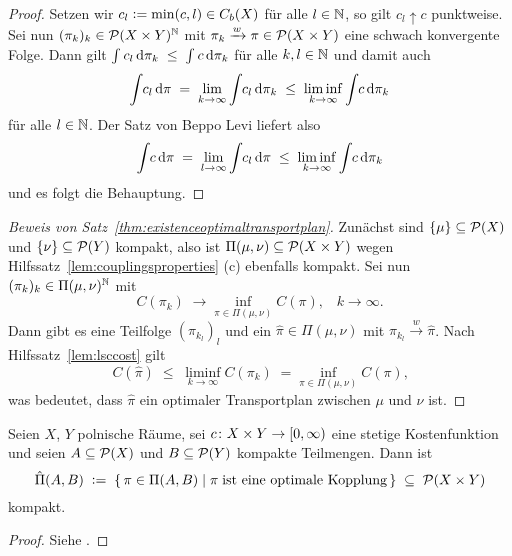 \documentclass[../main/main.tex]{subfiles}
\begin{document}
	\begin{proof}
		Setzen wir $c_l \vcentcolon = \min(c, l) \in C_b(X)$ für alle $l \in \mathbb{N}$, so gilt $c_l \uparrow c$ punktweise. Sei nun $(\pi_k)_k \in \mathcal{P}(X \times Y)^{\mathbb{N}}$ mit $\pi_k \xrightarrow{w} \pi \in \mathcal{P}(X \times Y)$ eine schwach konvergente Folge. Dann gilt
		$\int_{} \, c_l \, \mathrm{d}\pi_k \; \leq \; \int_{} \, c \, \mathrm{d}\pi_k$ für alle $k, l \in \mathbb{N}$ und damit auch 
		\[ \int_{} \, c_l \, \mathrm{d}\pi \; = \; \lim_{k \to \infty} \int_{} \, c_l \, \mathrm{d}\pi_k \; \leq \; \liminf_{k \to \infty} \int_{} \, c \, \mathrm{d}\pi_k \]
		für alle $l \in \mathbb{N}$. Der Satz von Beppo Levi liefert also
		\[ \int_{} \, c \, \mathrm{d}\pi \; = \; \lim_{l \to \infty} \int_{} \, c_l \, \mathrm{d}\pi \; \leq \; \liminf_{k \to \infty} \int_{} \, c \, \mathrm{d}\pi_k \]
		und es folgt die Behauptung.
	\end{proof}

	\begin{proof}[Beweis von Satz~\ref{thm:existenceoptimaltransportplan}]
		Zunächst sind $\left\{\mu\right\} \subseteq \mathcal{P}(X)$ und $\left\{\nu\right\} \subseteq \mathcal{P}(Y)$ kompakt, also ist $\Pi(\mu, \nu) \subseteq \mathcal{P}(X \times Y)$ 
		wegen Hilfssatz~\ref{lem:couplingsproperties} (c) ebenfalls kompakt.
		Sei nun $(\pi_k)_k \in \Pi(\mu, \nu)^{\mathbb{N}}$ mit
		\[ C(\pi_k) \; \to \inf_{\pi \in \Pi(\mu, \nu)} C(\pi) \text{,} \quad k \to \infty \text{.} \]
		Dann gibt es eine Teilfolge $(\pi_{k_l})_l$ und ein $\hat{\pi} \in \Pi(\mu, \nu)$ mit $\pi_{k_l} \xrightarrow{w} \hat{\pi}$. Nach Hilfssatz~\ref{lem:lsccost} gilt
		\[ C(\hat{\pi}) \; \leq \; \liminf_{k \to \infty} C(\pi_k) \; = \inf_{\pi \in \Pi(\mu, \nu)} C(\pi) \text{,} \]
		was bedeutet, dass $\hat{\pi}$ ein optimaler Transportplan zwischen $\mu$ und $\nu$ ist. 
	\end{proof}

	\begin{Satz}
		\label{thm:optimalplanscompact}
		Seien $X$, $Y$ polnische Räume, sei $c \colon X \times Y \to [0, \infty)$ eine stetige Kostenfunktion und seien $A \subseteq \mathcal{P}(X)$ und $B \subseteq \mathcal{P}(Y)$ kompakte Teilmengen.
		Dann ist 
		\[ \hat{\Pi}(A, B) \; \vcentcolon = \; \left\{\, \pi \in \Pi(A, B) \; \middle| \; \pi \; \text{ist eine optimale Kopplung} \,\right\} \; \subseteq \; \mathcal{P}(X \times Y) \]
		kompakt.
	\end{Satz}

	\begin{proof}
		Siehe \cite[Folgerung 5.21]{Villani.2009}.
	\end{proof}
\end{document}
